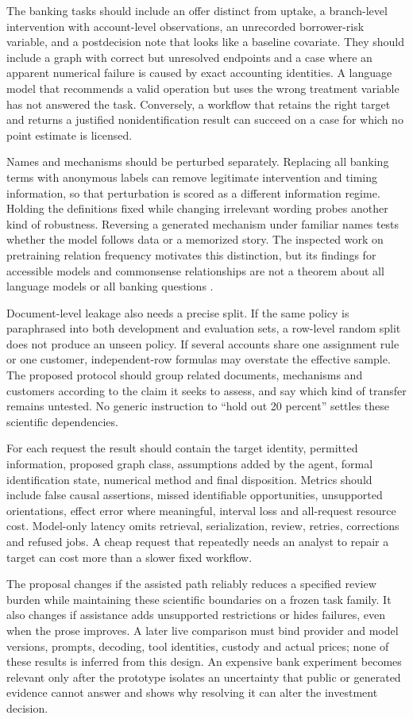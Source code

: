 The banking tasks should include an offer distinct from uptake, a branch-level
intervention with account-level observations, an unrecorded borrower-risk
variable, and a postdecision note that looks like a baseline covariate. They
should include a graph with correct but unresolved endpoints and a case where
an apparent numerical failure is caused by exact accounting identities. A
language model that recommends a valid operation but uses the wrong treatment
variable has not answered the task. Conversely, a workflow that retains the
right target and returns a justified nonidentification result can succeed on a
case for which no point estimate is licensed.

Names and mechanisms should be perturbed separately. Replacing all banking
terms with anonymous labels can remove legitimate intervention and timing
information, so that perturbation is scored as a different information regime.
Holding the definitions fixed while changing irrelevant wording probes another
kind of robustness. Reversing a generated mechanism under familiar names tests
whether the model follows data or a memorized story. The inspected work on
pretraining relation frequency motivates this distinction, but its findings
for accessible models and commonsense relationships are not a theorem about
all language models or all banking questions
\citep{v12_la_2407_19638}.

Document-level leakage also needs a precise split. If the same policy is
paraphrased into both development and evaluation sets, a row-level random split
does not produce an unseen policy. If several accounts share one assignment
rule or one customer, independent-row formulas may overstate the effective
sample. The proposed protocol should group related documents, mechanisms and
customers according to the claim it seeks to assess, and say which kind of
transfer remains untested. No generic instruction to ``hold out 20 percent''
settles these scientific dependencies.

For each request the result should contain the target identity, permitted
information, proposed graph class, assumptions added by the agent, formal
identification state, numerical method and final disposition. Metrics should
include false causal assertions, missed identifiable opportunities, unsupported
orientations, effect error where meaningful, interval loss and all-request
resource cost. Model-only latency omits retrieval, serialization, review,
retries, corrections and refused jobs. A cheap request that repeatedly needs an
analyst to repair a target can cost more than a slower fixed workflow.

The proposal changes if the assisted path reliably reduces a specified review
burden while maintaining these scientific boundaries on a frozen task family.
It also changes if assistance adds unsupported restrictions or hides failures,
even when the prose improves. A later live comparison must bind provider and
model versions, prompts, decoding, tool identities, custody and actual prices;
none of these results is inferred from this design. An expensive bank experiment
becomes relevant only after the prototype isolates an uncertainty that public
or generated evidence cannot answer and shows why resolving it can alter the
investment decision.
\label{exec14:l4-development-end}
